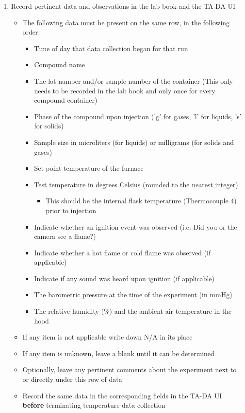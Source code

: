 \documentclass[letterpaper,11pt]{article}
\begin{document}
\begin{enumerate}
    \item Record pertinent data and observations in the lab book and the 
        TA-DA UI
        \begin{itemize}
        \item The following data must be present on the same row, in the 
            following order:
            \begin{itemize}
            \item Time of day that data collection began for that run
            \item Compound name 
            \item The lot number and/or sample number of the 
                container (This only needs to be recorded in the lab book  and 
                only once for every compound container)
            \item Phase of the compound upon injection ('g' for gases, 'l' for 
                liquids, 's' for solids)
            \item Sample size in microliters (for liquids) or milligrams
                (for solids and gases)
            \item Set-point temperature of the furnace
            \item Test temperature in degrees Celsius (rounded to the 
                nearest integer)
                \begin{itemize}
                \item This should be the internal flask temperature 
                    (Thermocouple 4) prior to injection
                \end{itemize}
            \item Indicate whether an ignition event was observed (i.e. Did you 
                or the camera see a flame?)
            \item Indicate whether a hot flame or cold flame was observed (if 
                applicable)
            \item Indicate if any sound was heard upon ignition (if applicable)
            \item The barometric pressure at the time of the experiment 
                (in mmHg)
            \item The relative humidity (\%) and the ambient air temperature
                in the hood
            \end{itemize}

        \item If any item is not applicable write down N/A in its place
        \item If any item is unknown, leave a blank until it can be determined
        \item Optionally, leave any pertinent comments about the experiment
            next to or directly under this row of data
        \item Record the same data in the corresponding fields in the TA-DA UI
            \textbf{before} terminating temperature data collection
        \end{itemize}
        

\end{enumerate}
\end{document}

